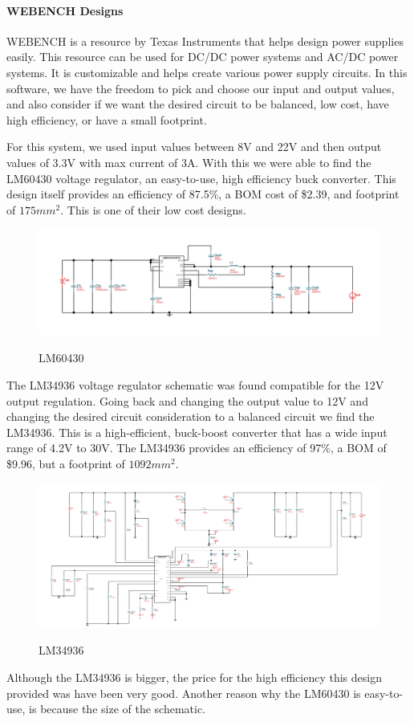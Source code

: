 \paragraph{WEBENCH Designs}
 WEBENCH is a resource by Texas Instruments that helps design power supplies easily. This resource can be used for DC/DC power systems and AC/DC power systems. It is customizable and helps create various power supply circuits. In this software, we have the freedom to pick and choose our input and output values, and also consider if we want the desired circuit to be balanced, low cost, have high efficiency, or have a small footprint. \par
 For this system, we used input values between 8V and 22V and then output values of 3.3V with max current of 3A. With this we were able to find the LM60430 voltage regulator, an easy-to-use, high efficiency buck converter. This design itself provides an efficiency of 87.5\%, a BOM cost of \$2.39, and footprint of $175mm^2$. This is one of their low cost designs.\par
 \begin{figure}[H]
    \centering
    \caption{LM60430}
    \includegraphics[width=\textwidth]{images/LM60430_WeBench.png}
    \label{fig:WEBENCH Design LM60430}
\end{figure}
The LM34936 voltage regulator schematic was found compatible for the 12V output regulation. Going back and changing the output value to 12V and changing the desired circuit consideration to a balanced circuit we find the LM34936. This is a high-efficient, buck-boost converter that has a wide input range of 4.2V to 30V. The LM34936 provides an efficiency of 97\%, a BOM of \$9.96, but a footprint of $1092mm^2$. \par
\begin{figure}[H]
    \centering
    \caption{LM34936}
    \includegraphics[width=\textwidth]{images/LM34936_WeBench.png}
    \label{fig:WEBENCH Design LM34936}
\end{figure}
Although the LM34936 is bigger, the price for the high efficiency this design provided was have been very good. Another reason why the LM60430 is easy-to-use, is because the size of the schematic.\par
